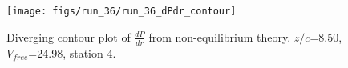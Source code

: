 \begin{figure}[H]
\centering
\texttt{[image: figs/run\_36/run\_36\_dPdr\_contour]}
\caption{Diverging contour plot of $\frac{d\bar{P}}{dr}$ from non-equilibrium theory. $z/c$=8.50, $V_{free}$=24.98, station 4.}
\label{fig:run_36_dPdr_contour}
\end{figure}


